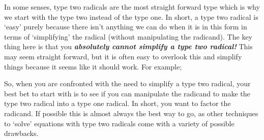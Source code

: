         In some senses, type two radicals are the most straight forward type which is why we start with the type two instead of the type one. In short, a type two radical is `easy' purely because there isn't anything we can do when it is in this form in terms of `simplifying' the radical (without manipulating the radicand). The key thing here is that you \textit{\textbf{absolutely cannot simplify a type two radical!}} This may seem straight forward, but it is often easy to overlook this and simplify things because it seems like it should work. For example;


        So, when you are confronted with the need to simplify a type two radical, your best bet to start with is to see if you can manipulate the radicand to make the type two radical into a type one radical. In short, you want to factor the radicand. If possible this is almost always the best way to go, as other techniques to `solve' equations with type two radicals come with a variety of possible drawbacks.


